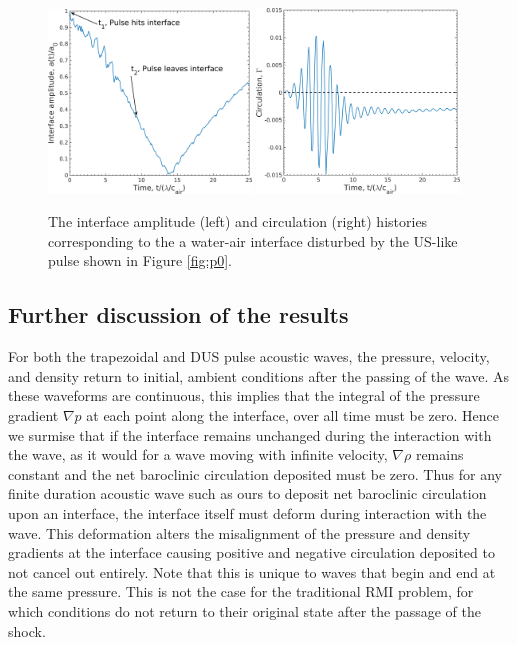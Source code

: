 \begin{figure}
  \centering
  \includegraphics[width=0.48\textwidth]{./figs/lung_figs/us_intf_schematic} \hfill
  \includegraphics[width=0.48\textwidth]{./figs/lung_figs/us_circ_schematic}
  \caption[The interface amplitude and circulation histories for the \ac{DUS} pulse]{The interface amplitude (left) and circulation (right)
    histories corresponding to the a water-air interface disturbed by
    the US-like pulse shown in Figure \ref{fig:p0}.}
  \label{fig:us_circ_interface}
\end{figure}

\subsection{Further discussion of the results}%
\label{subsec:usbe_lung_further_discussion}%
For both the trapezoidal and \ac{DUS} pulse acoustic waves, the
pressure, velocity, and density return to initial, ambient conditions
after the passing of the wave. As these waveforms are continuous, this
implies that the integral of the pressure gradient $\nabla p$ at each
point along the interface, over all time must be zero. Hence we
surmise that if the interface remains unchanged during the interaction
with the wave, as it would for a wave moving with infinite velocity,
$\nabla \rho$ remains constant and the net baroclinic circulation
deposited must be zero. Thus for any finite duration acoustic wave
such as ours to deposit net baroclinic circulation upon an interface,
the interface itself must deform during interaction with the
wave. This deformation alters the misalignment of the pressure and
density gradients at the interface causing positive and negative
circulation deposited to not cancel out entirely. Note that this is
unique to waves that begin and end at the same pressure. This is not
the case for the traditional \ac{RMI} problem, for which conditions do
not return to their original state after the passage of the shock.

